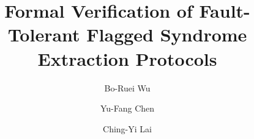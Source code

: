 \documentclass[acmsmall,screen,review,anonymous,nonacm]{acmart}
\begin{document}
\title{Formal Verification of Fault-Tolerant Flagged Syndrome Extraction Protocols}

\author{Bo-Ruei Wu}

\author{Yu-Fang Chen}

\author{Ching-Yi Lai}


 
\end{document}

